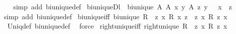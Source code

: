 \begin{isabellebody}
\ \ %
\endisadelimproof
%
\isatagproof
{}\isamarkupfalse%
{\isacharparenleft}{\kern0pt}simp\ add{\isacharcolon}{\kern0pt}\ bi{\isacharunderscore}{\kern0pt}unique{\isacharunderscore}{\kern0pt}def{\isacharparenright}{\kern0pt}%
\endisatagproof
{\isafoldproof}%
%
\isadelimproof
\isanewline
%
\endisadelimproof
\isanewline
{}\isamarkupfalse%
\ bi{\isacharunderscore}{\kern0pt}uniqueDl{\isacharcolon}{\kern0pt}\ {\isachardoublequoteopen}{\isasymlbrakk}\ bi{\isacharunderscore}{\kern0pt}unique\ A{\isacharsemicolon}{\kern0pt}\ A\ x\ y{\isacharsemicolon}{\kern0pt}\ A\ z\ y\ {\isasymrbrakk}\ {\isasymLongrightarrow}\ x\ {\isacharequal}{\kern0pt}\ z{\isachardoublequoteclose}\isanewline
%
\isadelimproof
\ \ %
\endisadelimproof
%
\isatagproof
{}\isamarkupfalse%
{\isacharparenleft}{\kern0pt}simp\ add{\isacharcolon}{\kern0pt}\ bi{\isacharunderscore}{\kern0pt}unique{\isacharunderscore}{\kern0pt}def{\isacharparenright}{\kern0pt}%
\endisatagproof
{\isafoldproof}%
%
\isadelimproof
\isanewline
%
\endisadelimproof
\isanewline
{}\isamarkupfalse%
\ bi{\isacharunderscore}{\kern0pt}unique{\isacharunderscore}{\kern0pt}iff{\isacharcolon}{\kern0pt}\ {\isachardoublequoteopen}bi{\isacharunderscore}{\kern0pt}unique\ R\ {\isasymlongleftrightarrow}\ {\isacharparenleft}{\kern0pt}{\isasymforall}z{\isachardot}{\kern0pt}\ {\isasymexists}\isactrlsub {\isasymle}x{\isachardot}{\kern0pt}\ R\ x\ z{\isacharparenright}{\kern0pt}\ {\isasymand}\ {\isacharparenleft}{\kern0pt}{\isasymforall}z{\isachardot}{\kern0pt}\ {\isasymexists}\isactrlsub {\isasymle}x{\isachardot}{\kern0pt}\ R\ z\ x{\isacharparenright}{\kern0pt}{\isachardoublequoteclose}\isanewline
%
\isadelimproof
\ \ %
\endisadelimproof
%
\isatagproof
{}\isamarkupfalse%
\ Uniq{\isacharunderscore}{\kern0pt}def\ bi{\isacharunderscore}{\kern0pt}unique{\isacharunderscore}{\kern0pt}def\ \isamarkupfalse%
\ force%
\endisatagproof
{\isafoldproof}%
%
\isadelimproof
\isanewline
%
\endisadelimproof
\isanewline
{}\isamarkupfalse%
\ right{\isacharunderscore}{\kern0pt}unique{\isacharunderscore}{\kern0pt}iff{\isacharcolon}{\kern0pt}\ {\isachardoublequoteopen}right{\isacharunderscore}{\kern0pt}unique\ R\ {\isasymlongleftrightarrow}\ {\isacharparenleft}{\kern0pt}{\isasymforall}z{\isachardot}{\kern0pt}\ {\isasymexists}\isactrlsub {\isasymle}x{\isachardot}{\kern0pt}\ R\ z\ x{\isacharparenright}{\kern0pt}{\isachardoublequoteclose}\isanewline
%
\isadelimproof
\ \ %
\endisadelimproof
%
\isatagproof

\end{isabellebody}
